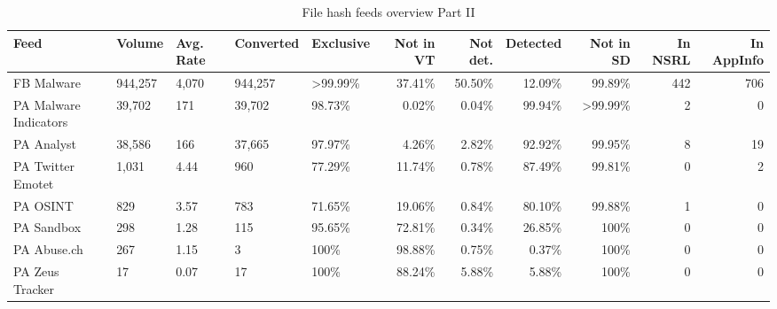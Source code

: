 \begin{table*}[htt]
\footnotesize \tabcolsep=0.11cm
\caption{File hash feeds overview Part II}
\centering
\small
\begin{tabular}{l H H H H | r r r | r r r }
\toprule
 Feed         &   Volume  &  Avg. Rate  & Converted &   Exclusive  &   Not in VT    &  Not det.  &   Detected   &   Not in SD &   In NSRL   &  In AppInfo  \\
\midrule
 FB Malware              &    944,257  &  4,070    & 944,257   &    >99.99\%    &     37.41\%    &    50.50\%      &     12.09\%          &    99.89\% &     442 &             706 \\
 PA Malware Indicators   &    39,702   &  171      & 39,702    &     98.73\%    &      0.02\%    &     0.04\%      &     99.94\%          &   >99.99\% &       2 &             0  \\
 PA Analyst              &    38,586   &  166      & 37,665    &     97.97\%    &      4.26\%    &     2.82\%      &     92.92\%          &    99.95\% &       8 &             19 \\
 PA Twitter Emotet       &    1,031    &  4.44     & 960       &     77.29\%    &     11.74\%    &     0.78\%      &     87.49\%          &    99.81\% &       0 &             2  \\
 PA OSINT                &    829      &  3.57     & 783       &     71.65\%    &     19.06\%    &     0.84\%      &     80.10\%          &    99.88\% &       1 &             0  \\
 PA Sandbox              &    298      &  1.28     & 115       &     95.65\%    &     72.81\%    &     0.34\%      &     26.85\%          &    100\% &         0 &             0  \\
 PA Abuse.ch             &    267      &  1.15     & 3         &       100\%    &     98.88\%    &     0.75\%      &      0.37\%          &    100\% &         0 &             0  \\
 PA Zeus Tracker         &    17       &  0.07     & 17        &       100\%    &     88.24\%    &     5.88\%      &      5.88\%          &    100\% &         0 &             0  \\
\bottomrule
\end{tabular}
\label{tab:md5-volume-2}
\end{table*}



%

